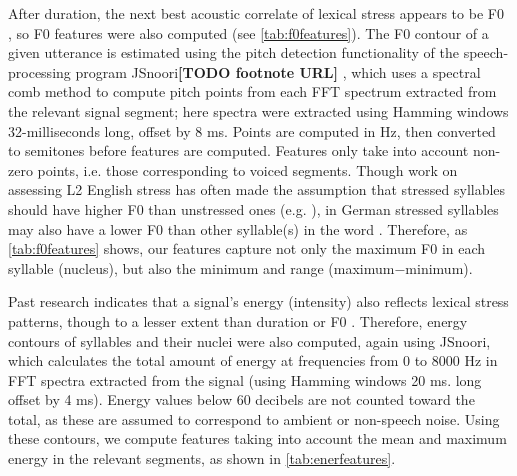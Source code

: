 \documentclass[a4paper]{article}
\newcommand{\TODO}[1]{{\color{red}\textbf{[TODO #1]}}}
\begin{document}
	   After duration, the next best acoustic correlate of lexical stress appears to be F0 \cite{Dogil1999}, so F0 features were also computed (see \cref{tab:f0features}).
	    The F0 contour of a given utterance is estimated using the pitch detection functionality of the speech-processing program JSnoori\TODO{footnote URL} \cite{DiMartino1999}, which uses a spectral comb method to compute pitch points from each FFT spectrum extracted from the relevant signal segment; here spectra were extracted using Hamming windows 32-milliseconds long, offset by 8 ms. Points are computed in Hz, then converted to semitones before features are computed. Features only take into account non-zero points, i.e. those corresponding to voiced segments.
	    Though work on assessing L2 English stress has often made the assumption that stressed syllables should have higher F0 than unstressed ones (e.g. \cite{Bonneau2011}), in German stressed syllables may also have a lower F0 than other syllable(s) in the word \cite[p.~267]{Cutler2005}. Therefore, as \cref{tab:f0features} shows, our features capture not only the maximum F0 in each syllable (nucleus), but also the minimum and range (maximum$-$minimum).
	    
	    Past research indicates that a signal's energy (intensity) also reflects lexical stress patterns, though to a lesser extent than duration or F0 \cite{Dogil1999,Cutler2005}.
	   Therefore, energy contours of syllables and their nuclei were also computed, again using JSnoori, which calculates the total amount of energy at frequencies from 0 to 8000 Hz in FFT spectra extracted from the signal (using Hamming windows 20 ms. long offset by 4 ms). Energy values below 60 decibels are not counted toward the total, as these are assumed to correspond to ambient or non-speech noise. Using these contours, we compute features taking into account the mean and maximum energy in the relevant segments, as shown in \cref{tab:enerfeatures}.
	    
\end{document}
